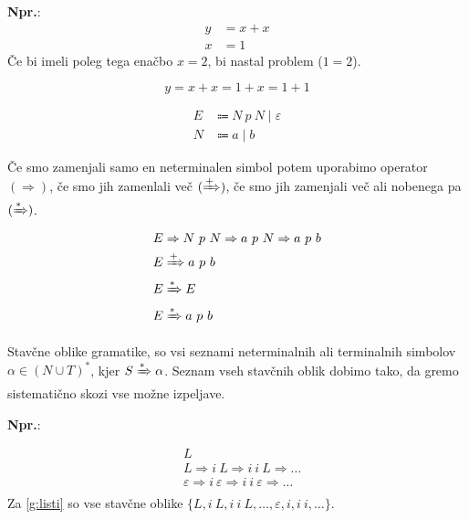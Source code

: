 \documentclass{article}
\newcommand{\Ex}{\textbf{Npr.}:\ }
\newcommand{\Grammar}{G}
\newcommand{\Terminals}{T}
\newcommand{\NonTerminals}{N}
\newcommand{\StartSymbol}{S}
\newcommand{\Null}{\varepsilon}
\newcommand{\Arrow}{\Coloneqq}
\newcommand{\Derive}{\Rightarrow}
\newcommand{\DeriveStar}{\xRightarrow{\ast}}
\newcommand{\DerivePlus}{\xRightarrow{+}}
\newcommand{\Seq}{\ }
\newcommand{\Union}{\mathrel{|}}
\newcommand{\Kleene}[1]{#1^\ast}
\begin{document}
\Ex
  \begin{align*}
    y &= x + x\\
    x &= 1
  \end{align*}
  Če bi imeli poleg tega enačbo $x = 2$, bi nastal problem ($1 = 2$).

  \begin{equation*}
    y = x + x = 1 + x = 1 + 1
  \end{equation*}

  \begin{equation}
    \tag{$\Grammar_2$}
    \label{g:plusab}
    \begin{aligned}
      E &\Arrow N \Seq p \Seq N \Union \Null\\
      N &\Arrow a \Union b
    \end{aligned}
  \end{equation}

Če smo zamenjali samo en neterminalen simbol potem uporabimo operator $(\Derive)$, če smo jih zamenlali več $(\DerivePlus)$, če smo jih zamenjali več ali nobenega pa $(\DeriveStar)$.
  \begin{align*}
    E &\Derive N \Seq p \Seq N \Derive a \Seq p \Seq N \Derive a \Seq p \Seq b \\
    E &\DerivePlus a \Seq p \Seq b\\
    E &\DeriveStar E\\
    E &\DeriveStar a \Seq p \Seq b
  \end{align*}

Stavčne oblike gramatike, so vsi seznami neterminalnih ali terminalnih simbolov $\alpha \in \Kleene{(\NonTerminals \cup \Terminals)}$, kjer $\StartSymbol \DeriveStar \alpha$.
Seznam vseh stavčnih oblik dobimo tako, da gremo sistematično skozi vse možne izpeljave.

\Ex

  \begin{align*}
    &L \\
    &L \Derive i \Seq L \Derive i \Seq i \Seq L \Derive \dots \\
    &\Null \Derive i \Seq \Null \Derive i \Seq i \Seq \Null \Derive \dots \\
  \end{align*}
Za \ref{g:listi} so vse stavčne oblike $\{L, i \Seq L, i \Seq i \Seq L, \dots, \Null, i, i \Seq i, \dots\}$.
\end{document}
